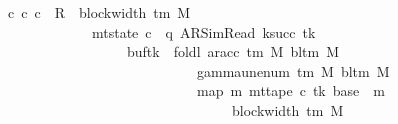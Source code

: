 \begin{isabellebody}
\ \ \ {\isachardoublequoteopen}{\isasymexists}c{\isacharprime}{\kern0pt}{\isacharprime}{\kern0pt}{\isachardot}{\kern0pt}\ {\isacharparenleft}{\kern0pt}c{\isacharprime}{\kern0pt}{\isacharcomma}{\kern0pt}\ c{\isacharprime}{\kern0pt}{\isacharprime}{\kern0pt}{\isacharparenright}{\kern0pt}\ {\isasymin}\ R{\isacharprime}{\kern0pt}\ {\isacharcircum}{\kern0pt}{\isacharcircum}{\kern0pt}\ {\isacharparenleft}{\kern0pt}block{\isacharunderscore}{\kern0pt}width\ {\isacharparenleft}{\kern0pt}{\isasymGamma}{\isacharunderscore}{\kern0pt}tm\ M{\isacharparenright}{\kern0pt}\ {\isacharplus}{\kern0pt}\ {}{\isacharparenright}{\kern0pt}\isanewline
\ \ \ \ \ \ \ \ \ \ \ \ \ \ {\isasymand}\ mt{\isacharunderscore}{\kern0pt}state\ c{\isacharprime}{\kern0pt}{\isacharprime}{\kern0pt}\ {\isacharequal}{\kern0pt}\ {\isacharparenleft}{\kern0pt}q{\isacharcomma}{\kern0pt}\ AR{\isacharunderscore}{\kern0pt}SimRead{\isacharcomma}{\kern0pt}\ k{\isacharunderscore}{\kern0pt}succ\ tk{\isacharcomma}{\kern0pt}\ {}{\isacharcomma}{\kern0pt}\isanewline
\ \ \ \ \ \ \ \ \ \ \ \ \ \ \ \ \ \ \ \ buf{\isacharparenleft}{\kern0pt}tk\ {\isacharcolon}{\kern0pt}{\isacharequal}{\kern0pt}\ foldl\ {\isacharparenleft}{\kern0pt}ar{\isacharunderscore}{\kern0pt}acc\ {\isacharparenleft}{\kern0pt}{\isasymGamma}{\isacharunderscore}{\kern0pt}tm\ M{\isacharparenright}{\kern0pt}\ {\isacharparenleft}{\kern0pt}bl{\isacharunderscore}{\kern0pt}tm\ M{\isacharparenright}{\kern0pt}{\isacharparenright}{\kern0pt}\isanewline
\ \ \ \ \ \ \ \ \ \ \ \ \ \ \ \ \ \ \ \ \ \ \ \ \ \ \ \ \ \ {\isacharparenleft}{\kern0pt}gamma{\isacharunderscore}{\kern0pt}unenum\ {\isacharparenleft}{\kern0pt}{\isasymGamma}{\isacharunderscore}{\kern0pt}tm\ M{\isacharparenright}{\kern0pt}\ {\isacharparenleft}{\kern0pt}bl{\isacharunderscore}{\kern0pt}tm\ M{\isacharparenright}{\kern0pt}\ {}{\isacharparenright}{\kern0pt}\isanewline
\ \ \ \ \ \ \ \ \ \ \ \ \ \ \ \ \ \ \ \ \ \ \ \ \ \ \ \ \ \ {\isacharparenleft}{\kern0pt}map\ {\isacharparenleft}{\kern0pt}{\isasymlambda}m{\isachardot}{\kern0pt}\ mt{\isacharunderscore}{\kern0pt}tape\ c{\isacharprime}{\kern0pt}\ tk\ {\isacharparenleft}{\kern0pt}base\ {\isacharplus}{\kern0pt}\ m{\isacharparenright}{\kern0pt}{\isacharparenright}{\kern0pt}\isanewline
\ \ \ \ \ \ \ \ \ \ \ \ \ \ \ \ \ \ \ \ \ \ \ \ \ \ \ \ \ \ \ \ \ \ \ {\isacharbrackleft}{\kern0pt}{}{\isachardot}{\kern0pt}{\isachardot}{\kern0pt}{\isacharless}{\kern0pt}block{\isacharunderscore}{\kern0pt}width\ {\isacharparenleft}{\kern0pt}{\isasymGamma}{\isacharunderscore}{\kern0pt}tm\ M{\isacharparenright}{\kern0pt}{\isacharbrackright}{\kern0pt}{\isacharparenright}{\kern0pt}{\isacharparenright}{\kern0pt}{\isacharcomma}{\kern0pt}\isanewline

\end{isabellebody}
